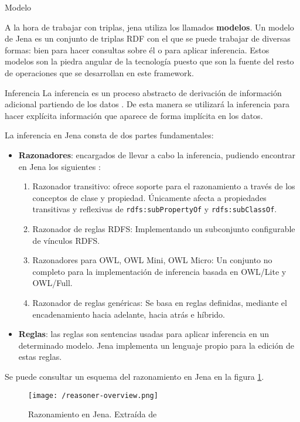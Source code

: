 \begin{definitionlist}
  \item[Modelo]

    A la hora de trabajar con triplas, jena utiliza los llamados
    \textbf{modelos}. Un modelo de Jena es un conjunto de triplas \acs{RDF} con
    el que se puede trabajar de diversas formas: bien para hacer consultas sobre
    él o para aplicar inferencia. Estos modelos son la piedra angular de la
    tecnología puesto que son la fuente del resto de operaciones que se
    desarrollan en este framework. 

  \item[Inferencia]
    La inferencia es un proceso abstracto de derivación de información adicional
    partiendo de los datos \cite{JENA}. De esta manera se utilizará la
    inferencia para hacer explícita información que aparece de forma implícita
    en los datos. 

    La inferencia en Jena consta de dos partes fundamentales: 
    \begin{itemize}
    \item \textbf{Razonadores}: encargados de llevar a cabo la inferencia,
      pudiendo encontrar en Jena los siguientes \cite{JENA}: 
      \begin{enumerate}
      \item Razonador transitivo: ofrece soporte para el razonamiento a través
        de los conceptos de clase y propiedad. Únicamente afecta a propiedades
        transitivas y reflexivas de \texttt{rdfs:subPropertyOf} y
        \texttt{rdfs:subClassOf}. 
      \item Razonador de reglas RDFS: Implementando un subconjunto configurable
        de vínculos RDFS. 
      \item Razonadores para OWL, OWL Mini, OWL Micro: Un conjunto no completo
        para la implementación de inferencia basada en OWL/Lite y OWL/Full. 
      \item Razonador de reglas genéricas: Se basa en reglas definidas, mediante
        el encadenamiento hacia adelante, hacia atrás e híbrido. 
      \end{enumerate}
    \item \textbf{Reglas}: las reglas son sentencias usadas para aplicar inferencia en un
      determinado modelo. Jena implementa un lenguaje propio para la edición de
      estas reglas. 
    \end{itemize}

Se puede consultar un esquema del razonamiento en Jena en la figura
\ref{fig:jenareasoning}. 

\begin{figure}[!h]
  \begin{center}
    \texttt{[image: /reasoner-overview.png]} 
    \caption{Razonamiento en Jena. Extraída de \cite{JENA}}
    \label{fig:jenareasoning}
  \end{center}
\end{figure}


\end{definitionlist}

